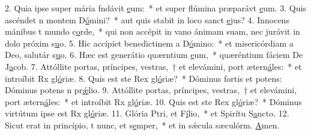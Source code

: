 2. Quia ipse super mária fndávit \uline{e}um:~* et super flúmina præparávt \uline{e}um.
3. Quis ascéndet n montem D\uline{ó}mini?~* aut quis stabit in loco sanct \uline{e}jus?
4. Innocens mánibus t mundo c\uline{o}rde,~* qui non accépit in vano ánimam suam, nec jurávit in dolo próxim s\uline{u}o.
5. Hic accípiet benedictinem a D\uline{ó}mino:~* et misericórdiam a Deo, salutár s\uline{u}o.
6. Hæc est generátio quærntium \uline{e}um,~* quæréntium fáciem De J\uline{a}cob.
7. Attóllite portas, príncipes, vestras,~† et elevámini, port ætern\uline{á}les:~* et introíbit Rx gl\uline{ó}riæ.
8. Quis est ste Rex gl\uline{ó}riæ?~* Dóminus fortis et potens: Dóminus potens n pr\uline{ǽ}lio.
9. Attóllite portas, príncipes, vestras,~† et elevámini, port ætern\uline{á}les:~* et introíbit Rx gl\uline{ó}riæ.
10. Quis est ste Rex gl\uline{ó}riæ?~* Dóminus virtútum ipse est Rx gl\uline{ó}riæ.
11. Glória Ptri, et F\uline{í}lio,~* et Spirítu S\uline{a}ncto.
12. Sicut erat in princípio, t nunc, et s\uline{e}mper,~* et in sǽcula sæculórm. \uline{A}men.

